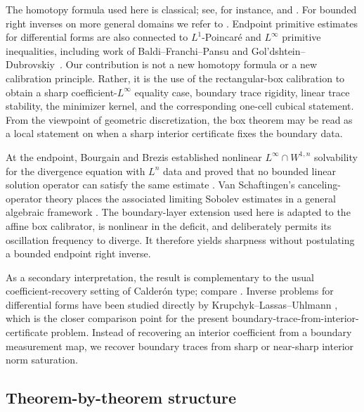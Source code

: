 \documentclass[11pt,letterpaper]{article}
\numberwithin{equation}{section}
\theoremstyle{plain}
\theoremstyle{definition}
\theoremstyle{remark}
\begin{document}
The homotopy formula used here is classical; see, for instance,
\cite[section~3]{BottTu1982} and
\cite{Whitney1957,Dodziuk1976,Dupont1976,DupontBook1978,Albert2020,
ArnoldFalkWinther2010,ArnoldAwanou2014}. For bounded right inverses on more
general domains we refer to
\cite{Bogovskii1979,IwaniecLutoborski1993,CostabelMcIntosh2010,
GuzmanSalgado2021,ChaumontFreletLichtVohralik2025}. Endpoint primitive
estimates for differential forms are also connected to $L^1$-Poincar\'e and
$L^\infty$ primitive inequalities, including work of Baldi--Franchi--Pansu
\cite{BaldiFranchiPansu2019,BaldiFranchiPansu2020} and
Gol'dshtein--Dubrovskiy~\cite{GoldshteinDubrovskiy2009}. Our contribution is
not a new homotopy formula or a new calibration principle.  Rather, it is the
use of the rectangular-box calibration to obtain a sharp
coefficient-$L^\infty$ equality case, boundary trace rigidity, linear trace
stability, the minimizer kernel, and the corresponding one-cell cubical
statement.  From the viewpoint of geometric discretization, the box theorem may
be read as a local statement on when a sharp interior certificate fixes the
boundary data.

At the endpoint, Bourgain and Brezis established nonlinear
$L^\infty\cap W^{1,n}$ solvability for the divergence equation with $L^n$ data
and proved that no bounded linear solution operator can satisfy the same
estimate \cite{BourgainBrezis2003,BourgainBrezis2007}.  Van Schaftingen's
canceling-operator theory places the associated limiting Sobolev estimates in
a general algebraic framework \cite{VanSchaftingen2013}.  The boundary-layer
extension used here is adapted to the affine box calibrator, is nonlinear in
the deficit, and deliberately permits its oscillation frequency to diverge.
It therefore yields sharpness without postulating a bounded endpoint right
inverse.

As a secondary interpretation, the result is complementary to the usual
coefficient-recovery setting of Calder\'on type; compare
\cite{Calderon1980,Uhlmann2009}. Inverse problems for differential forms have
been studied directly by Krupchyk--Lassas--Uhlmann
\cite{KrupchykLassasUhlmann2011}, which is the closer comparison point for the
present boundary-trace-from-interior-certificate problem. Instead of recovering
an interior coefficient from a boundary measurement map, we recover boundary
traces from sharp or near-sharp interior norm saturation.

\subsection{Theorem-by-theorem structure}
\end{document}
